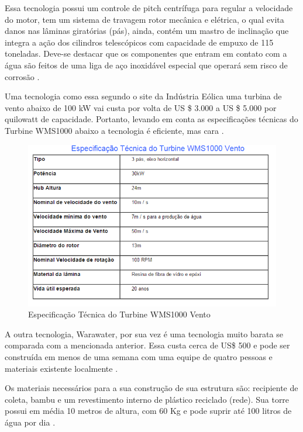 Essa tecnologia possui um controle de pitch centrífuga para regular a velocidade do motor, tem um sistema de travagem
rotor mecânica e elétrica, o qual evita danos nas lâminas giratórias (pás), ainda, contém um mastro de inclinação que 
integra a ação dos cilindros telescópicos com capacidade de empuxo de 115 toneladas. Deve-se destacar que os componentes 
que entram em contato com a água são feitos de uma liga de aço inoxidável especial que operará sem risco de corrosão 
\cite{eole}.

Uma tecnologia como essa segundo o site da Indústria Eólica uma turbina de vento abaixo de 100 kW vai custa por volta
de US \$ 3.000 a US \$ 5.000  por quilowatt de capacidade. Portanto, levando em conta as especificações técnicas do Turbine
WMS1000 abaixo a tecnologia é eficiente, mas cara \cite{renewable}.
	
\begin{figure}[!htbp]
\centering
\includegraphics[scale=0.8]{editaveis/figuras/especificacao}
\caption[Especificação Técnica do Turbine WMS1000]{Especificação Técnica do Turbine WMS1000 Vento \footnotemark}
\FloatBarrier
\label{Especificacoes}
\end{figure}
 
A outra tecnologia, Warawater, por sua vez é uma tecnologia muito barata se comparada com a mencionada anterior. 
Essa custa cerca de US\$ 500 e pode ser construída em menos de uma semana com uma equipe de quatro pessoas e materiais 
existente localmente \cite{warkawater}.

Os materiais necessários para a sua construção de sua estrutura são: recipiente de coleta, bambu e um revestimento
interno de plástico reciclado (rede). Sua torre possui em média 10 metros de altura, com 60 Kg e pode suprir até 100 litros
de água por dia \cite{warkawater2}.


